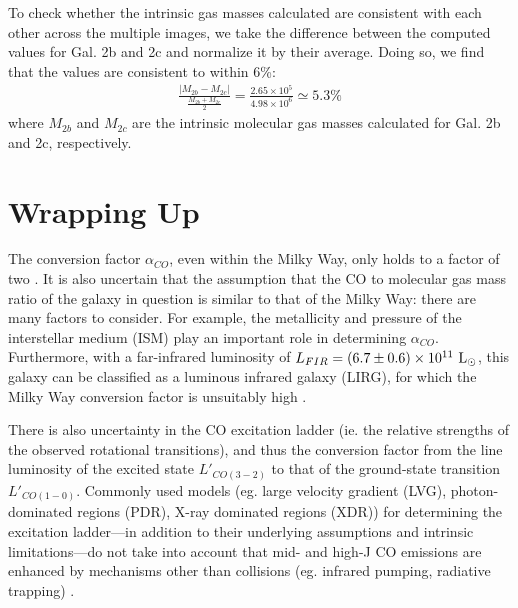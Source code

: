 \documentclass[11pt]{article}
\begin{document}
To check whether the intrinsic gas masses calculated are consistent with each other across the multiple images, we take the difference between the computed values for Gal. 2b and 2c and normalize it by their average. Doing so, we find that the values are consistent to within 6\%: 
\begin{align}
    \frac{|M_{2b} - M_{2c}|}{\frac{M_{2b}+M_{2c}}{2}} = \frac{2.65\times 10^{5}}{4.98\times 10^{6}} \simeq 5.3\%
\end{align}
where $M_{2b}$ and $M_{2c}$ are the intrinsic molecular gas masses calculated for Gal. 2b and 2c, respectively. 

\section*{Wrapping Up}

The conversion factor $\alpha_{CO}$, even within the Milky Way, only holds to a factor of two \citep{Carilli2013}. It is also uncertain that the assumption that the CO to molecular gas mass ratio of the galaxy in question is similar to that of the Milky Way: there are many factors to consider. For example, the metallicity and pressure of the interstellar medium (ISM) play an important role in determining $\alpha_{CO}$. Furthermore, with a far-infrared luminosity of $L_{FIR} = (6.7 \pm 0.6)\times 10^{11}~{\rm L_\odot}$, this galaxy can be classified as a luminous infrared galaxy (LIRG), for which the Milky Way conversion factor is unsuitably high \citep{Carilli2013}. 

There is also uncertainty in the CO excitation ladder (ie. the relative strengths of the observed rotational transitions), and thus the conversion factor from the line luminosity of the excited state $L'_{CO(3-2)}$ to that of the ground-state transition $L'_{CO(1-0)}$. Commonly used models (eg. large velocity gradient (LVG), photon-dominated regions (PDR), X-ray dominated regions (XDR)) for determining the excitation ladder---in addition to their underlying assumptions and intrinsic limitations---do not take into account that mid- and high-J CO emissions are enhanced by mechanisms other than collisions (eg. infrared pumping, radiative trapping) \citep{Carilli2013}. 
\end{document}
